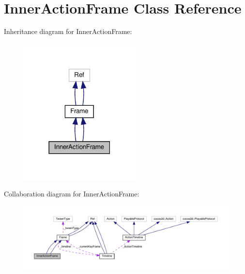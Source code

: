 \hypertarget{classInnerActionFrame}{}\section{Inner\+Action\+Frame Class Reference}
\label{classInnerActionFrame}


Inheritance diagram for Inner\+Action\+Frame\+:
\nopagebreak
\begin{figure}[H]
\begin{center}
\leavevmode
\includegraphics[width=174pt]{classInnerActionFrame__inherit__graph}
\end{center}
\end{figure}


Collaboration diagram for Inner\+Action\+Frame\+:
\nopagebreak
\begin{figure}[H]
\begin{center}
\leavevmode
\includegraphics[width=350pt]{classInnerActionFrame__coll__graph}
\end{center}
\end{figure}

